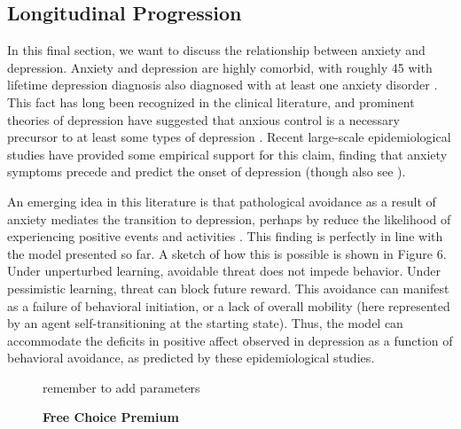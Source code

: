 \documentclass[11pt]{article} %
\begin{document}
\subsection{Longitudinal Progression}

In this final section, we want to discuss the relationship between anxiety and
depression. Anxiety and depression are highly comorbid, with roughly 45%
with lifetime depression diagnosis also diagnosed with at least one anxiety disorder
\citep{kessler2015}. This fact has long been recognized in the clinical literature,
and prominent theories of depression have suggested that anxious control is a necessary
precursor to at least some types of depression \citep{alloy1990}. Recent large-scale
epidemiological studies have provided  some empirical support for this claim, finding that
anxiety symptoms precede and predict the onset of depression \citep{mathew2011, jacobson2014,
kessler2015} (though also see \cite{jacobson2017, plana2019}).

An emerging idea in this literature is that pathological avoidance as a result
of anxiety mediates the transition to depression, perhaps by reduce the likelihood
of experiencing positive events and activities \citep{moitra2008, jacobson2014}.
This finding is perfectly in line with the model presented so far. A sketch of
how this is possible is shown in Figure 6. Under unperturbed learning, avoidable
threat does not impede behavior. Under pessimistic learning, threat can block
future reward. This avoidance can manifest as a failure of behavioral initiation,
or a lack of overall mobility (here represented by an agent self-transitioning
at the starting state). Thus, the model can accommodate the deficits in positive
affect observed in depression as a function of behavioral avoidance, as predicted
by these epidemiological studies.

\begin{figure}
  \centerline{%
  }
  \caption{\textbf{Free Choice Premium}}
  \par remember to add parameters
\end{figure}
\end{document}
